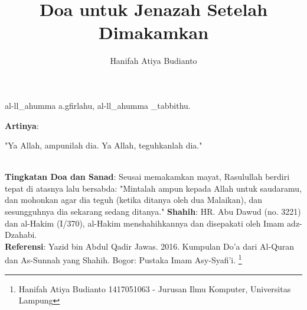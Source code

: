 \documentclass[a4paper,12pt]{article}
\title{\Large Doa untuk Jenazah Setelah Dimakamkan}
\author{\calligra Hanifah Atiya Budianto}
\begin{document}
\sffamily
\maketitle 
\fullvocalize
{}
\begin{arabtext}
\noindent
al-ll_ahumma a.gfirlahu, al-ll_ahumma _tabbithu.\\
\end{arabtext}
\noindent
\textbf{Artinya}:
\par
\indent
"Ya Allah, ampunilah dia. Ya Allah, teguhkanlah dia."\\\\
\par
\noindent
\textbf{Tingkatan Doa dan Sanad}: Seusai memakamkan mayat, Rasulullah 
berdiri tepat di atasnya lalu bersabda: "Mintalah ampun kepada Allah untuk 
saudaramu, dan mohonkan agar dia teguh (ketika ditanya oleh dua Malaikan), 
dan sesungguhnya dia sekarang sedang ditanya." \textbf{Shahih}: HR. Abu 
Dawud (no. 3221) dan al-Hakim (I/370), al-Hakim menshahihkannya dan 
disepakati oleh Imam adz-Dzahabi.\\
\textbf{Referensi}: Yazid bin Abdul Qadir Jawas. 2016. Kumpulan Do'a dari
Al-Quran dan As-Sunnah yang Shahih. Bogor: Pustaka Imam Asy-Syafi'i.
\footnote{Hanifah Atiya Budianto 1417051063 - Jurusan Ilmu Komputer,
Universitas Lampung}
\end{document}
